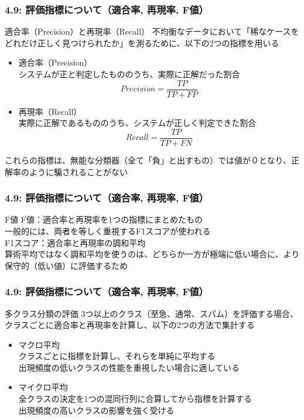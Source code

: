 \documentclass[unicode,11pt]{beamer} %
\begin{document}
\begin{frame}
    \frametitle{4.9: 評価指標について（適合率, 再現率, F値）}
    \begin{alertblock}{適合率（Precision）と再現率（Recall）}
        不均衡なデータにおいて「稀なケースをどれだけ正しく見つけられたか」を測るために、以下の2つの指標を用いる
        \begin{itemize}
            \item 適合率（Precision）\\システムが正と判定したもののうち、実際に正解だった割合
            \begin{equation*}
                Precision = \frac{TP}{TP+FP}
            \end{equation*}
            \item 再現率（Recall）\\実際に正解であるもののうち、システムが正しく判定できた割合
            \begin{equation*}
                Recall = \frac{TP}{TP + FN}
            \end{equation*}
        \end{itemize}
        これらの指標は、無能な分類器（全て「負」と出すもの）では値が０となり、正解率のように騙されることがない
    \end{alertblock}
\end{frame}

\begin{frame}
    \frametitle{4.9: 評価指標について（適合率, 再現率, F値）}
    \begin{alertblock}{F値}
        F値：適合率と再現率を1つの指標にまとめたもの
        \\一般的には、両者を等しく重視するF1スコアが使われる
        \\F1スコア：適合率と再現率の調和平均
        \\算術平均ではなく調和平均を使うのは、どちらか一方が極端に低い場合に、より保守的（低い値）に評価するため
    \end{alertblock}
\end{frame}

\begin{frame}
    \frametitle{4.9: 評価指標について（適合率, 再現率, F値）}
    \begin{alertblock}{多クラス分類の評価}
        3つ以上のクラス（至急、通常、スパム）を評価する場合、クラスごとに適合率と再現率を計算し、以下の2つの方法で集計する
        \begin{itemize}
            \item マクロ平均\\クラスごとに指標を計算し、それらを単純に平均する
            \\出現頻度の低いクラスの性能を重視したい場合に適している
            \item マイクロ平均\\全クラスの決定を1つの混同行列に合算してから指標を計算する
            \\出現頻度の高いクラスの影響を強く受ける
        \end{itemize}
    \end{alertblock}
\end{frame}
\end{document}
